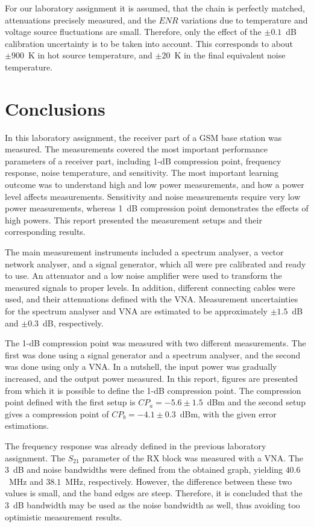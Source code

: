 \documentclass[a4paper, 12pt]{article}
\begin{document}
For our laboratory assignment it is assumed, that the chain is perfectly matched, attenuations 
precisely measured, and the $\mathit{ENR}$ variations due to temperature and voltage source fluctuations 
are small. Therefore, only the effect of the $\pm 0.1$~dB calibration uncertainty is to be 
taken into account. This corresponds to about $\pm900$~K in hot source temperature, and 
$\pm20$~K in the final equivalent noise temperature.

\newpage
\section{Conclusions}

In this laboratory assignment, the receiver part of a GSM base station was measured. The 
measurements covered the most important performance parameters of a receiver part, including 
1-dB compression point, frequency response, noise temperature, and sensitivity. The most 
important learning outcome was to understand high and low power measurements, and how a 
power level affects measurements. Sensitivity and noise measurements require very low power 
measurements, whereas 1~dB compression point demonstrates the effects of high powers. This 
report presented the measurement setups and their corresponding results.

The main measurement instruments included a spectrum analyser, a vector network analyser, and 
a signal generator, which all were pre calibrated and ready to use. An attenuator and a low 
noise amplifier were used to transform the measured signals to proper levels. In addition, 
different connecting cables were used, and their attenuations defined with the VNA. Measurement 
uncertainties for the spectrum analyser and VNA are estimated to be approximately $\pm1.5$~dB 
and $\pm0.3$~dB, respectively.

The 1-dB compression point was measured with two different measurements. The first was done 
using a signal generator and a spectrum analyser, and the second was done using only a VNA. 
In a nutshell, the input power was gradually increased, and the output power measured. In this 
report, figures are presented from which it is possible to define the 1-dB compression point. 
The compression point defined with the first setup is $CP_a = -5.6 \pm 1.5$~dBm and the second 
setup gives a compression point of $CP_b = -4.1 \pm 0.3$~dBm, with the given error estimations.

The frequency response was already defined in the previous laboratory assignment. The $S_{21}$ 
parameter of the RX block was measured with a VNA. The $3$~dB and noise bandwidths were 
defined from the obtained graph, yielding $40.6$~MHz and $38.1$~MHz, respectively. However, 
the difference between these two values is small, and the band edges are steep. Therefore, it is concluded that the $3$~dB 
bandwidth may be used as the noise bandwidth as well, thus avoiding too optimistic measurement 
results.
\end{document}
